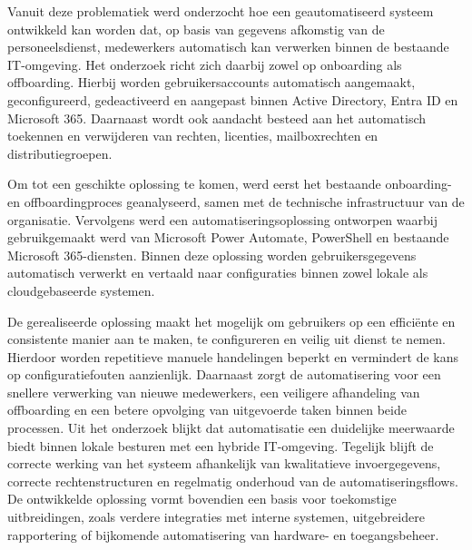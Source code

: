 Vanuit deze problematiek werd onderzocht hoe een geautomatiseerd systeem ontwikkeld kan worden dat, op basis van gegevens afkomstig van de personeelsdienst, medewerkers automatisch kan verwerken binnen de bestaande IT-omgeving. Het onderzoek richt zich daarbij zowel op onboarding als offboarding. Hierbij worden gebruikersaccounts automatisch aangemaakt, geconfigureerd, gedeactiveerd en aangepast binnen Active Directory, Entra ID en Microsoft 365. Daarnaast wordt ook aandacht besteed aan het automatisch toekennen en verwijderen van rechten, licenties, mailboxrechten en distributiegroepen.\newline

Om tot een geschikte oplossing te komen, werd eerst het bestaande onboarding- en offboardingproces geanalyseerd, samen met de technische infrastructuur van de organisatie. Vervolgens werd een automatiseringsoplossing ontworpen waarbij gebruikgemaakt werd van Microsoft Power Automate, PowerShell en bestaande Microsoft 365-diensten. Binnen deze oplossing worden gebruikersgegevens automatisch verwerkt en vertaald naar configuraties binnen zowel lokale als cloudgebaseerde systemen.\newline

De gerealiseerde oplossing maakt het mogelijk om gebruikers op een efficiënte en consistente manier aan te maken, te configureren en veilig uit dienst te nemen. Hierdoor worden repetitieve manuele handelingen beperkt en vermindert de kans op configuratiefouten aanzienlijk. Daarnaast zorgt de automatisering voor een snellere verwerking van nieuwe medewerkers, een veiligere afhandeling van offboarding en een betere opvolging van uitgevoerde taken binnen beide processen.\newline
\newline
Uit het onderzoek blijkt dat automatisatie een duidelijke meerwaarde biedt binnen lokale besturen met een hybride IT-omgeving. Tegelijk blijft de correcte werking van het systeem afhankelijk van kwalitatieve invoergegevens, correcte rechtenstructuren en regelmatig onderhoud van de automatiseringsflows. De ontwikkelde oplossing vormt bovendien een basis voor toekomstige uitbreidingen, zoals verdere integraties met interne systemen, uitgebreidere rapportering of bijkomende automatisering van hardware- en toegangsbeheer.\newline
